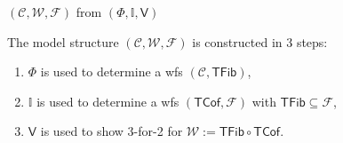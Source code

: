 \documentclass[handout]{beamer}
\newcommand{\myemph}[1]{\textbf{#1}}    %
\newcommand{\C}{\ensuremath{\mathbb{C}}}
\newcommand{\Set}{\ensuremath{\mathsf{Set}}}
\newcommand{\msf}[1]{\ensuremath{\mathsf{#1}}}
\newcommand{\ra}{\ensuremath{\rightarrow}}
\newcommand{\yon}{\ensuremath{\mathsf{y}}}
\newcommand{\EE}{\mathcal{E}}
\newcommand{\V}{\mathsf{V}}
\newcommand{\II}{\mathbb{I}}
\theoremstyle{remark}
\begin{document}
%
%
%
%
%
%
\begin{frame}{$(\mathcal{C},\mathcal{W},\mathcal{F})$ from $(\Phi, \II, \V)$}

The model structure $(\mathcal{C}, \mathcal{W}, \mathcal{F})$ is constructed in 3 steps:\medskip

\begin{enumerate}
\item $\Phi$ is used to determine a wfs $(\mathcal{C},\mathsf{TFib})$,
\item $\II$ is used to determine a wfs $(\mathsf{TCof}, \mathcal{F})$ with $\mathsf{TFib}\subseteq\mathcal{F}$,
\item $\V$ is used to show 3-for-2 for $\mathcal{W} := \mathsf{TFib}\circ\mathsf{TCof}$.
\end{enumerate}

\end{frame}
%
\end{document}
